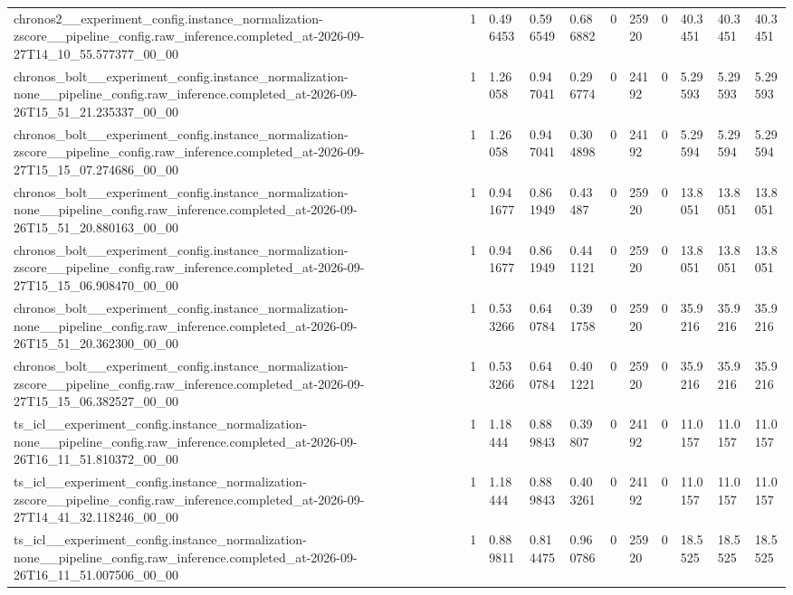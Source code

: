 \begin{tabular}{lllllllllll}
chronos2\_\_experiment\_config.instance\_normalization-zscore\_\_pipeline\_config.raw\_inference.completed\_at-2026-09-27T14\_10\_55.577377\_00\_00 & 1 & 0.496453 & 0.596549 & 0.686882 & 0 & 25920 & 0 & 40.3451 & 40.3451 & 40.3451 \\
chronos\_bolt\_\_experiment\_config.instance\_normalization-none\_\_pipeline\_config.raw\_inference.completed\_at-2026-09-26T15\_51\_21.235337\_00\_00 & 1 & 1.26058 & 0.947041 & 0.296774 & 0 & 24192 & 0 & 5.29593 & 5.29593 & 5.29593 \\
chronos\_bolt\_\_experiment\_config.instance\_normalization-zscore\_\_pipeline\_config.raw\_inference.completed\_at-2026-09-27T15\_15\_07.274686\_00\_00 & 1 & 1.26058 & 0.947041 & 0.304898 & 0 & 24192 & 0 & 5.29594 & 5.29594 & 5.29594 \\
chronos\_bolt\_\_experiment\_config.instance\_normalization-none\_\_pipeline\_config.raw\_inference.completed\_at-2026-09-26T15\_51\_20.880163\_00\_00 & 1 & 0.941677 & 0.861949 & 0.43487 & 0 & 25920 & 0 & 13.8051 & 13.8051 & 13.8051 \\
chronos\_bolt\_\_experiment\_config.instance\_normalization-zscore\_\_pipeline\_config.raw\_inference.completed\_at-2026-09-27T15\_15\_06.908470\_00\_00 & 1 & 0.941677 & 0.861949 & 0.441121 & 0 & 25920 & 0 & 13.8051 & 13.8051 & 13.8051 \\
chronos\_bolt\_\_experiment\_config.instance\_normalization-none\_\_pipeline\_config.raw\_inference.completed\_at-2026-09-26T15\_51\_20.362300\_00\_00 & 1 & 0.533266 & 0.640784 & 0.391758 & 0 & 25920 & 0 & 35.9216 & 35.9216 & 35.9216 \\
chronos\_bolt\_\_experiment\_config.instance\_normalization-zscore\_\_pipeline\_config.raw\_inference.completed\_at-2026-09-27T15\_15\_06.382527\_00\_00 & 1 & 0.533266 & 0.640784 & 0.401221 & 0 & 25920 & 0 & 35.9216 & 35.9216 & 35.9216 \\
ts\_icl\_\_experiment\_config.instance\_normalization-none\_\_pipeline\_config.raw\_inference.completed\_at-2026-09-26T16\_11\_51.810372\_00\_00 & 1 & 1.18444 & 0.889843 & 0.39807 & 0 & 24192 & 0 & 11.0157 & 11.0157 & 11.0157 \\
ts\_icl\_\_experiment\_config.instance\_normalization-zscore\_\_pipeline\_config.raw\_inference.completed\_at-2026-09-27T14\_41\_32.118246\_00\_00 & 1 & 1.18444 & 0.889843 & 0.403261 & 0 & 24192 & 0 & 11.0157 & 11.0157 & 11.0157 \\
ts\_icl\_\_experiment\_config.instance\_normalization-none\_\_pipeline\_config.raw\_inference.completed\_at-2026-09-26T16\_11\_51.007506\_00\_00 & 1 & 0.889811 & 0.814475 & 0.960786 & 0 & 25920 & 0 & 18.5525 & 18.5525 & 18.5525 \\

\end{tabular}
